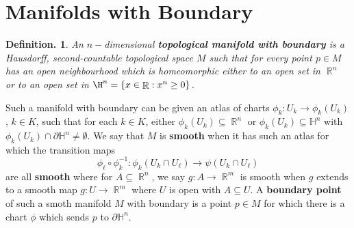\documentclass[11pt, a4paper]{memoir}
\DeclareMathOperator{\R}{{\mathbb{R}}}
\theoremstyle{change}
\theoremstyle{plain}
\theoremstyle{nonumberplain}
\newtheorem{definition}{Definition.}
\numberwithin{equation}{section}
\begin{document}
\section{Manifolds with Boundary}
\begin{definition}
    An $n-$dimensional \textbf{topological manifold with boundary} is a Hausdorff, second-countable topological space $M$ such that for every point $p\in M$ has an open neighbourhood which is homeomorphic either to an open set in $\R^n$ or to an open set in $\H^n=\{x\in\R:x^n\geq 0\}$.
\end{definition}
Such a manifold with boundary can be given an atlas of charts $\phi_k:U_k\to\phi_k(U_k)$, $k\in K$, such that for each $k\in K$, either $\phi_k(U_k)\subseteq\R^n$ or $\phi_k(U_k)\subseteq\mathbb{H}^n$ with $\phi_k(U_k)\cap\partial\mathbb{H}^n\neq\emptyset$.
We say that $M$ is \textbf{smooth} when it has such an atlas for which the transition maps
\begin{equation*}
    \phi_\ell\circ\phi_k^{-1}:\phi_k(U_k\cap U_\ell)\to\psi(U_k\cap U_\ell)
\end{equation*}
are all \textbf{smooth} where for $A\subseteq\R^n$, we say $g:A\to\R^m$ is smooth when $g$ extends to a smooth map $g:U\to\R^m$ where $U$ is open with $A\subseteq U$.
A \textbf{boundary point} of such a smoth manifold $M$ with boundary is a point $p\in M$ for which there is a chart $\phi$ which sends $p$ to $\partial\mathbb{H}^n$.
\end{document}
